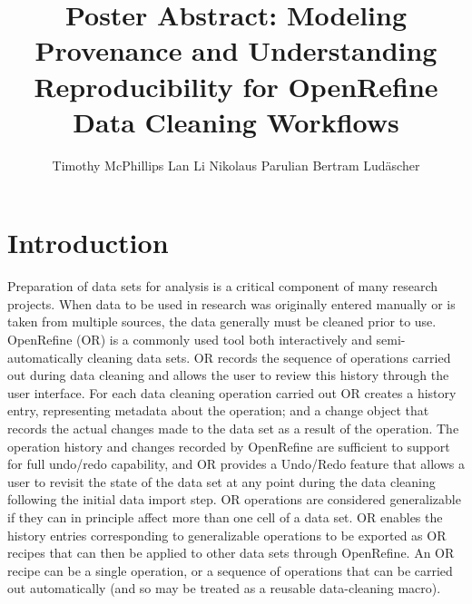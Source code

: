 \documentclass[sigconf,screen,nonacm]{acmart}
\begin{document}
\title[Reproducible Data Cleaning]{Poster Abstract: Modeling
  Provenance and Understanding Reproducibility for OpenRefine Data Cleaning Workflows}

\author{Timothy McPhillips \qquad Lan Li \qquad Nikolaus Parulian \qquad Bertram Lud\"ascher}
 


\maketitle

\section{Introduction}

Preparation of data sets for analysis is a critical component of many research projects.
When data to be used in research was originally entered manually or is taken from multiple sources, the data generally must be cleaned prior to use.
OpenRefine (OR) is a commonly used tool both interactively and semi-automatically cleaning data sets.
OR records the sequence of operations carried out during data cleaning and allows the user to review this history through the user interface.
For each data cleaning operation carried out OR creates a history entry, representing metadata about the operation; and a change object that records the actual changes made to the data set as a result of the operation.
The operation history and changes recorded by OpenRefine are sufficient to support for full undo/redo capability, and OR provides a Undo/Redo feature that allows a user to revisit the state of the data set at any point during the data cleaning following the initial data import step.
OR operations are considered generalizable if they can in principle affect more than one cell of a data set.
OR enables the history entries corresponding to generalizable operations to be exported as  OR recipes that can then be applied to other data sets through OpenRefine.
An OR recipe can be a single operation, or a sequence of operations that can be carried out automatically (and so may be treated as a reusable data-cleaning macro).
\cite{verborgh_using_2013}
\end{document}
